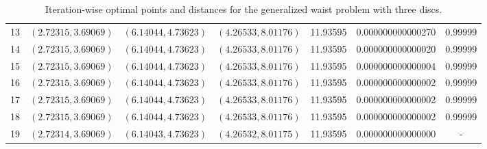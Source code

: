 \documentclass[12pt]{article}
\theoremstyle{plain}
\theoremstyle{definition}
\begin{document}
\begin{table}[H]
\begin{sideways}
\begin{tabular}{|c|c|c|c|c|c|c|}
			13 & $(2.72315, 3.69069)$ & $(6.14044, 4.73623)$ & $(4.26533, 8.01176)$ & 11.93595 & 0.000000000000270 & 0.99999  \\ 
			14 & $(2.72315, 3.69069)$ & $(6.14044, 4.73623)$ & $(4.26533, 8.01176)$ & 11.93595 & 0.000000000000020 & 0.99999 \\ 
			15 & $(2.72315, 3.69069)$ & $(6.14044, 4.73623)$ & $(4.26533, 8.01176)$ & 11.93595 & 0.000000000000004 & 0.99999  \\ 
			16 & $(2.72315, 3.69069)$ & $(6.14044, 4.73623)$ & $(4.26533, 8.01176)$ & 11.93595 & 0.000000000000002 & 0.99999  \\ 
			17 & $(2.72315, 3.69069)$ & $(6.14044, 4.73623)$ & $(4.26533, 8.01176)$ & 11.93595 & 0.000000000000002 & 0.99999  \\ 
			18 & $(2.72315, 3.69069)$ & $(6.14044, 4.73623)$ & $(4.26533, 8.01176)$ & 11.93595 & 0.000000000000002 & 0.99999  \\ 
			19 & $(2.72314, 3.69069)$ & $(6.14043, 4.73623)$ & $(4.26532, 8.01175)$ & 11.93595 & 0.000000000000000 & -  \\
			\hline
		\end{tabular}
	\end{sideways}
	\caption{Iteration-wise optimal points and distances for the generalized waist problem with three discs.}
	\label{tab:example1_iteration_data}
\end{table}
\end{document}
